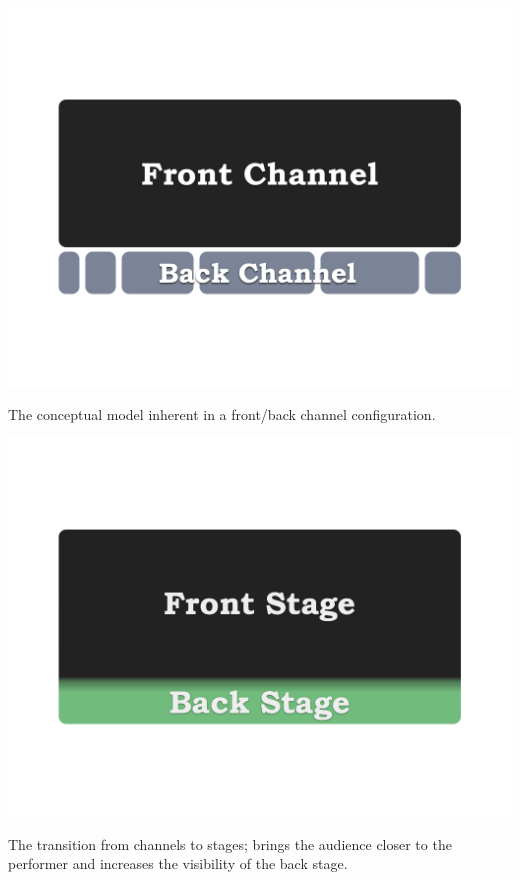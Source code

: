 \begin{marginfigure}
	\includegraphics{figures/front-back-channel.png}
	\caption{The conceptual model inherent in a front/back channel configuration.}
	\label{fig:front-back-channel}
\end{marginfigure}

\begin{marginfigure}
	\includegraphics{figures/front-stage-back-stage.png}
	\caption{The transition from channels to stages; brings the audience closer to the performer and increases the visibility of the back stage.}
	\label{fig:front-back-stage}
\end{marginfigure}

